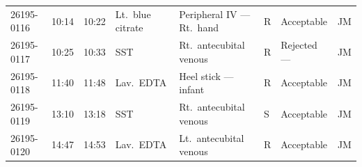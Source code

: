 \begin{center}
{\begin{longtable}{@{}C{1.9cm}C{1.15cm}C{1.15cm}L{2.2cm}L{3.2cm}C{0.7cm}L{2.7cm}C{0.9cm}@{}}
26195-0116 & 10:14 & 10:22 & Lt.\ blue citrate & Peripheral IV --- Rt.\ hand & R & Acceptable & JM \\
26195-0117 & 10:25 & 10:33 & SST & Rt.\ antecubital venous & R & Rejected ---  & JM \\
26195-0118 & 11:40 & 11:48 & Lav.\ EDTA & Heel stick --- infant & R & Acceptable & JM \\
26195-0119 & 13:10 & 13:18 & SST & Rt.\ antecubital venous & S & Acceptable & JM \\
26195-0120 & 14:47 & 14:53 & Lav.\ EDTA & Lt.\ antecubital venous & R & Acceptable & JM \\
\end{longtable}
}
\end{center}

\vspace{-4pt}
